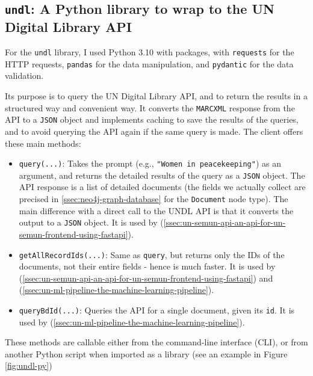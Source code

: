 \subsection{\texttt{undl}: A Python library to wrap to the UN Digital Library API} \label{ssec:undl-a-python-library-to-wrap-to-the-un-digital-library-api}

For the \texttt{undl} library, I used Python 3.10 with packages, with \texttt{requests} for the HTTP requests, \texttt{pandas} for the data manipulation, and \texttt{pydantic} for the data validation.

Its purpose is to query the UN Digital Library API, and to return the results in a structured way and convenient way. It converts the \texttt{MARCXML} response from the API to a \texttt{JSON} object and implements caching to save the results of the queries, and to avoid querying the API again if the same query is made. The client offers these main methods:

\begin{itemize}
    \item \texttt{query(...)}:
          Takes the prompt (e.g., \texttt{"Women in peacekeeping"}) as an argument, and returns the detailed results of the query as a \texttt{JSON} object. The API response is a list of detailed documents (the fields we actually collect are precised in \ref{ssec:neo4j-graph-database} for the \texttt{Document} node type).
          The main difference with a direct call to the UNDL API is that it converts the output to a \texttt{JSON} object. It is used by  (\ref{ssec:un-semun-api-an-api-for-un-semun-frontend-using-fastapi}).

    \item \texttt{getAllRecordIds(...)}:
          Same as \texttt{query}, but returns only the IDs of the documents, not their entire fields - hence is much faster. It is used by  (\ref{ssec:un-semun-api-an-api-for-un-semun-frontend-using-fastapi}) and  (\ref{ssec:un-ml-pipeline-the-machine-learning-pipeline}).

    \item \texttt{queryBdId(...)}:
          Queries the API for a single document, given its \texttt{id}. It is used by  (\ref{ssec:un-ml-pipeline-the-machine-learning-pipeline}).
\end{itemize}

These methods are callable either from the command-line interface (CLI), or from another Python script when imported as a library (see an example in Figure \ref{fig:undl-py})

